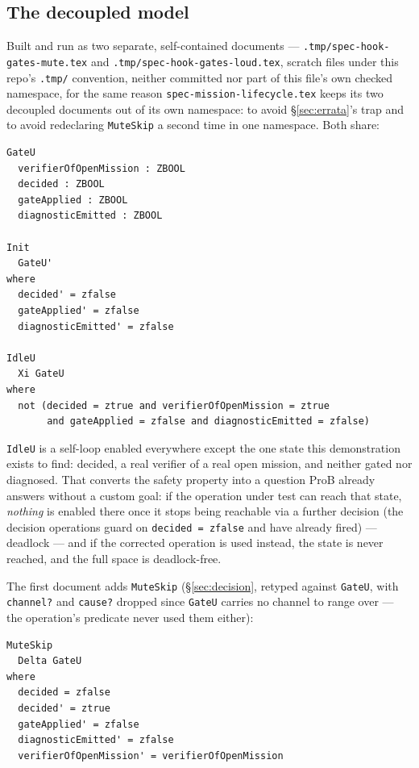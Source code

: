 \documentclass[a4paper,10pt,fleqn]{article}
\newcommand{\fpath}[1]{\texttt{#1}}
\newcommand{\field}[1]{\texttt{#1}}
\begin{document}
\subsection{The decoupled model}

Built and run as two separate, self-contained documents ---
\fpath{.tmp/spec-hook-gates-mute.tex} and
\fpath{.tmp/spec-hook-gates-loud.tex}, scratch files under this
repo's \fpath{.tmp/} convention, neither committed nor part of this
file's own checked namespace, for the same reason
\fpath{spec-mission-lifecycle.tex} keeps its two decoupled documents
out of its own namespace: to avoid \S\ref{sec:errata}'s trap and to
avoid redeclaring \field{MuteSkip} a second time in one namespace.
Both share:

\begin{verbatim}
GateU
  verifierOfOpenMission : ZBOOL
  decided : ZBOOL
  gateApplied : ZBOOL
  diagnosticEmitted : ZBOOL

Init
  GateU'
where
  decided' = zfalse
  gateApplied' = zfalse
  diagnosticEmitted' = zfalse

IdleU
  Xi GateU
where
  not (decided = ztrue and verifierOfOpenMission = ztrue
       and gateApplied = zfalse and diagnosticEmitted = zfalse)
\end{verbatim}

\field{IdleU} is a self-loop enabled everywhere except the one state
this demonstration exists to find: decided, a real verifier of a real
open mission, and neither gated nor diagnosed. That converts the
safety property into a question ProB already answers without a
custom goal: if the operation under test can reach that state,
\emph{nothing} is enabled there once it stops being reachable via a
further decision (the decision operations guard on \field{decided =
zfalse} and have already fired) --- deadlock --- and if the corrected
operation is used instead, the state is never reached, and the full
space is deadlock-free.

The first document adds \field{MuteSkip} (\S\ref{sec:decision},
retyped against \field{GateU}, with \field{channel?} and
\field{cause?} dropped since \field{GateU} carries no channel to
range over --- the operation's predicate never used them either):

\begin{verbatim}
MuteSkip
  Delta GateU
where
  decided = zfalse
  decided' = ztrue
  gateApplied' = zfalse
  diagnosticEmitted' = zfalse
  verifierOfOpenMission' = verifierOfOpenMission
\end{verbatim}
\end{document}
